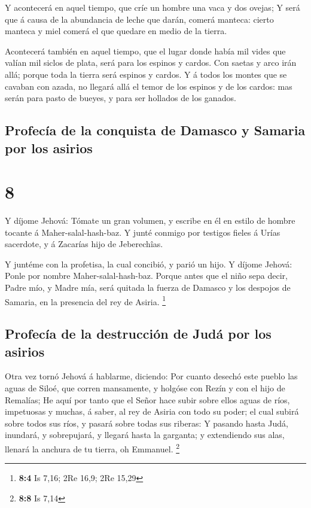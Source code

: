  Y acontecerá en aquel tiempo, que críe un hombre una vaca
y dos ovejas;  Y será que á causa de la abundancia de leche
que darán, comerá manteca: cierto manteca y miel comerá el que quedare
en medio de la tierra.

 Acontecerá también en aquel tiempo, que el lugar donde
había mil vides que valían mil siclos de plata, será para los espinos y
cardos.  Con saetas y arco irán allá; porque toda la tierra
será espinos y cardos.  Y á todos los montes que se cavaban
con azada, no llegará allá el temor de los espinos y de los cardos: mas
serán para pasto de bueyes, y para ser hollados de los ganados.

\hypertarget{profecuxeda-de-la-conquista-de-damasco-y-samaria-por-los-asirios}{%
\subsection{Profecía de la conquista de Damasco y Samaria por los
asirios}\label{profecuxeda-de-la-conquista-de-damasco-y-samaria-por-los-asirios}}

\hypertarget{section-7}{%
\section{8}\label{section-7}}

 Y díjome Jehová: Tómate un gran volumen, y escribe en él en
estilo de hombre tocante á Maher-salal-hash-baz.  Y junté
conmigo por testigos fieles á Urías sacerdote, y á Zacarías hijo de
Jeberechîas.

 Y juntéme con la profetisa, la cual concibió, y parió un
hijo. Y díjome Jehová: Ponle por nombre Maher-salal-hash-baz.
 Porque antes que el niño sepa decir, Padre mío, y Madre
mía, será quitada la fuerza de Damasco y los despojos de Samaria, en la
presencia del rey de Asiria. \footnote{\textbf{8:4} Is 7,16; 2Re 16,9;
  2Re 15,29}

\hypertarget{profecuxeda-de-la-destrucciuxf3n-de-juduxe1-por-los-asirios}{%
\subsection{Profecía de la destrucción de Judá por los
asirios}\label{profecuxeda-de-la-destrucciuxf3n-de-juduxe1-por-los-asirios}}

 Otra vez tornó Jehová á hablarme, diciendo: 
Por cuanto desechó este pueblo las aguas de Siloé, que corren
mansamente, y holgóse con Rezín y con el hijo de Remalías; 
He aquí por tanto que el Señor hace subir sobre ellos aguas de ríos,
impetuosas y muchas, á saber, al rey de Asiria con todo su poder; el
cual subirá sobre todos sus ríos, y pasará sobre todas sus riberas:
 Y pasando hasta Judá, inundará, y sobrepujará, y llegará
hasta la garganta; y extendiendo sus alas, llenará la anchura de tu
tierra, oh Emmanuel. \footnote{\textbf{8:8} Is 7,14}

